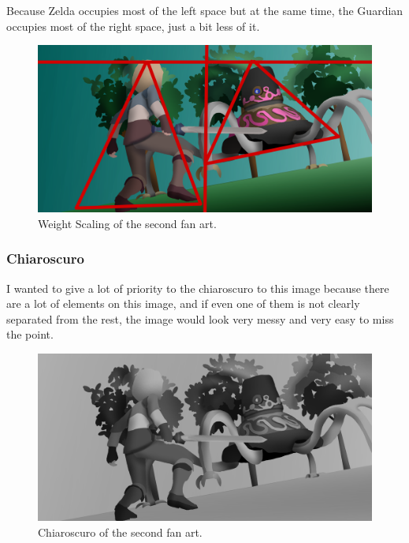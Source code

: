 \documentclass{cup-pan}
\begin{document}
            Because Zelda occupies most of the left space but at the same time, the Guardian occupies most of the right space, just a bit less of it.\\

            \begin{figure}[H]
                \includegraphics[width=\textwidth]{Imagenes/Fanart2/Analysis/balanza.png}
                \caption{Weight Scaling of the second fan art.}
            \end{figure}

        \subsubsection{Chiaroscuro}

            I wanted to give a lot of priority to the chiaroscuro to this image because there are a lot of elements on this image, and if even one of them is not clearly separated from the rest, the image would look very messy and very easy to miss the point.\\
            \begin{figure}[H]
                \includegraphics[width=\textwidth]{Imagenes/Fanart2/Analysis/claroscuro.png}
                \caption{Chiaroscuro of the second fan art.}
            \end{figure}
\end{document}
